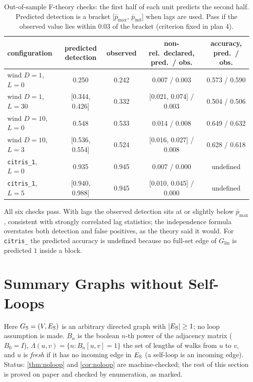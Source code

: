 \begin{table}[h]
\caption{Out-of-sample F-theory checks: the first half of each unit predicts the second half. Predicted detection is a bracket [$\bar p_{\max}$, $\bar p_{\mathrm{ind}}$] when lags are used. Pass if the observed value lies within 0.03 of the bracket (criterion fixed in plan 4).}
\label{tab:fcheck}
\centering\small
\setlength{\tabcolsep}{4pt}
\begin{tabular}{lcccc}
\toprule
configuration & predicted detection & observed & non-rel.\ declared, pred.\ / obs. & accuracy, pred.\ / obs. \\
\midrule
wind $D{=}1$, $L{=}0$ & 0.250 & 0.242 & 0.007 / 0.003 & 0.573 / 0.590 \\
wind $D{=}1$, $L{=}30$ & [0.344, 0.426] & 0.332 & [0.021, 0.074] / 0.003 & 0.504 / 0.506 \\
wind $D{=}10$, $L{=}0$ & 0.548 & 0.533 & 0.014 / 0.008 & 0.649 / 0.632 \\
wind $D{=}10$, $L{=}3$ & [0.536, 0.554] & 0.524 & [0.016, 0.027] / 0.008 & 0.628 / 0.618 \\
\texttt{citris\_1}, $L{=}0$ & 0.935 & 0.945 & 0.007 / 0.000 & undefined \\
\texttt{citris\_1}, $L{=}5$ & [0.940, 0.988] & 0.945 & [0.010, 0.045] / 0.000 & undefined \\
\bottomrule
\end{tabular}
\end{table}

All six checks pass. With lags the observed detection sits at or slightly below $\bar p_{\max}$, consistent with strongly correlated lag statistics; the independence formula overstates both detection and false positives, as the theory said it would.
For \texttt{citris\_} the predicted accuracy is undefined because no full-set edge of $G_{\mathrm{lin}}$ is predicted $1$ inside a block.

\section{Summary Graphs without Self-Loops}
\label{app:noloop}

Here $G_{\mathrm S}=(V,E_{\mathrm S})$ is an arbitrary directed graph with $|E_{\mathrm S}|\ge1$; no loop
assumption is made. $B_n$ is the boolean $n$-th power of the adjacency matrix
($B_0=I$), $\Lambda(u,v)=\{n:B_n[u,v]=1\}$ the set of lengths of walks from $u$
to $v$, and $u$ is \emph{fresh} if it has no incoming edge in $E_{\mathrm S}$ (a self-loop
is an incoming edge). Status: \cref{thm:noloop} and \cref{cor:noloop} are
machine-checked; the rest of this section is proved on paper and checked by
enumeration, as marked.


